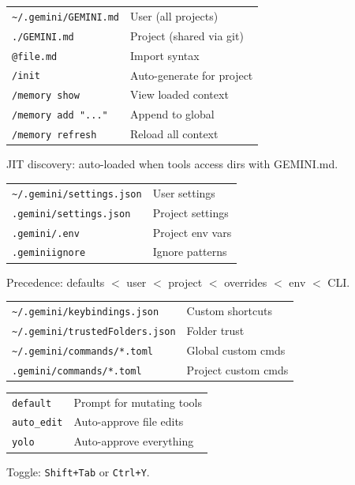 \documentclass[9pt]{extarticle}
\newcommand{\sect}[1]{\needspace{4\baselineskip}\vspace{6pt}{\footnotesize\bfseries\scshape #1}\par\vspace{2pt}}
\begin{document}
\begin{multicols}{3}

\sect{GEMINI.md Files}
\begin{tabularx}{\linewidth}{@{}l@{\enspace}Y@{}}
\texttt{\~{}/.gemini/GEMINI.md}     & User (all projects) \\
\texttt{./GEMINI.md}                 & Project (shared via git) \\
\texttt{@file.md}                    & Import syntax \\
\texttt{/init}                       & Auto-generate for project \\
\texttt{/memory show}               & View loaded context \\
\texttt{/memory add "..."}          & Append to global \\
\texttt{/memory refresh}            & Reload all context \\
\end{tabularx}
{\footnotesize JIT discovery: auto-loaded when tools access dirs with GEMINI.md.}

\sect{Settings Files}
\begin{tabularx}{\linewidth}{@{}l@{\enspace}Y@{}}
\texttt{\~{}/.gemini/settings.json}  & User settings \\
\texttt{.gemini/settings.json}       & Project settings \\
\texttt{.gemini/.env}                & Project env vars \\
\texttt{.geminiignore}               & Ignore patterns \\
\end{tabularx}
{\footnotesize Precedence: defaults $<$ user $<$ project $<$ overrides $<$ env $<$ CLI.}

\sect{Other Config Files}
\begin{tabularx}{\linewidth}{@{}l@{\enspace}Y@{}}
\texttt{\~{}/.gemini/keybindings.json} & Custom shortcuts \\
\texttt{\~{}/.gemini/trustedFolders.json} & Folder trust \\
\texttt{\~{}/.gemini/commands/*.toml} & Global custom cmds \\
\texttt{.gemini/commands/*.toml}     & Project custom cmds \\
\end{tabularx}

\sect{Approval Modes}
\begin{tabularx}{\linewidth}{@{}l@{\enspace}Y@{}}
\texttt{default}                     & Prompt for mutating tools \\
\texttt{auto\_edit}                  & Auto-approve file edits \\
\texttt{yolo}                        & Auto-approve everything \\
\end{tabularx}
{\footnotesize Toggle: \texttt{Shift+Tab} or \texttt{Ctrl+Y}.}


\end{multicols}
\end{document}
